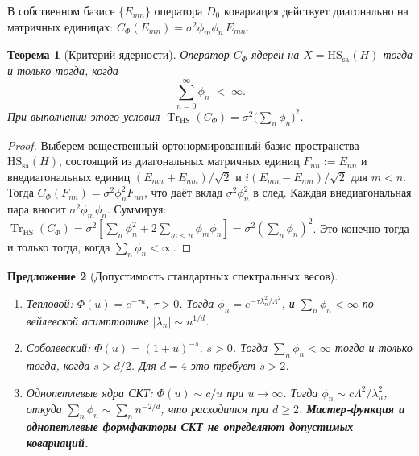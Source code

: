 \documentclass[12pt,a4paper]{article}
\theoremstyle{plain}
\newtheorem{theorem}{Теорема}[section]
\newtheorem{proposition}[theorem]{Предложение}
\theoremstyle{definition}
\theoremstyle{remark}
\newcommand{\Tr}{\operatorname{Tr}}
\newcommand{\HS}{\mathrm{HS}}
\newcommand{\sa}{\mathrm{sa}}
\newcommand{\Lam}{\Lambda}
\begin{document}
В собственном базисе $\{E_{mn}\}$ оператора $D_0$ ковариация
действует диагонально на матричных единицах:
$C_\Phi(E_{mn}) = \sigma^2 \phi_m \phi_n\, E_{mn}$.

\begin{theorem}[Критерий ядерности]
\label{thm:trace-class}
Оператор $C_\Phi$ ядерен на $X = \HS_\sa(H)$ тогда и только тогда,
когда
\begin{equation}\label{eq:trace-class-condition}
  \sum_{n=0}^\infty \phi_n \;<\; \infty.
\end{equation}
При выполнении этого условия $\Tr_{\HS}(C_\Phi) = \sigma^2\bigl(\sum_n
\phi_n\bigr)^2$.
\end{theorem}

\begin{proof}
Выберем вещественный ортонормированный базис пространства
$\HS_\sa(H)$, состоящий из диагональных матричных единиц
$F_{nn} := E_{nn}$ и внедиагональных единиц
$(E_{mn} + E_{nm})/\sqrt{2}$ и $i(E_{mn} - E_{nm})/\sqrt{2}$
для $m < n$.  Тогда $C_\Phi(F_{nn}) = \sigma^2 \phi_n^2 F_{nn}$,
что даёт вклад $\sigma^2\phi_n^2$ в след.  Каждая внедиагональная
пара вносит $\sigma^2 \phi_m\phi_n$.  Суммируя:
$\Tr_{\HS}(C_\Phi) = \sigma^2[\sum_n \phi_n^2 + 2\sum_{m<n}
\phi_m\phi_n] = \sigma^2(\sum_n \phi_n)^2$.  Это конечно тогда и
только тогда, когда $\sum_n \phi_n < \infty$.
\end{proof}

\begin{proposition}[Допустимость стандартных спектральных весов]
\label{prop:admissibility}
\hfill
\begin{enumerate}[label=\textup{(\alph*)},leftmargin=2.5em]
  \item Тепловой: $\Phi(u) = e^{-\tau u}$, $\tau > 0$.  Тогда
    $\phi_n = e^{-\tau\lambda_n^2/\Lam^2}$, и $\sum_n \phi_n <
    \infty$ по вейлевской асимптотике $|\lambda_n| \sim n^{1/d}$.
  \item Соболевский: $\Phi(u) = (1+u)^{-s}$, $s > 0$.  Тогда
    $\sum_n \phi_n < \infty$ тогда и только тогда, когда
    $s > d/2$.  Для $d=4$ это требует $s > 2$.
  \item Однопетлевые ядра СКТ: $\Phi(u) \sim c/u$ при
    $u \to \infty$.  Тогда
    $\phi_n \sim c\Lam^2/\lambda_n^2$, откуда
    $\sum_n \phi_n \sim \sum_n n^{-2/d}$, что расходится при
    $d \ge 2$.
    \textbf{Мастер-функция и однопетлевые формфакторы СКТ не
    определяют допустимых ковариаций.}
\end{enumerate}
\end{proposition}
\end{document}

